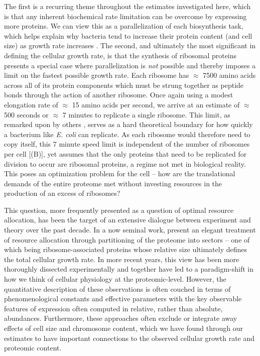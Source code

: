 The first is a recurring theme throughout the estimates investigated here, which
is that any inherent biochemical rate limitation can be overcome by expressing
more proteins. We can view this as a parallelization of each biosynthesis task,
which helps explain why bacteria tend to increase their protein content (and
cell size) as growth rate increases \citep{ojkic2019}. The second, and
ultimately the most significant in defining the cellular growth rate, is that
the synthesis of ribosomal proteins presents a special case where
parallelization is \textit{not} possible and thereby imposes a limit on the
fastest possible growth rate. Each ribosome has $\approx$ 7500 amino acids
across all of its protein components which must be strung together as peptide
bonds through the action of another ribosome. Once again using a modest
elongation rate of $\approx$ 15 amino acids per second, we arrive at an estimate of
$\approx$ 500 seconds or $\approx$ 7 minutes to replicate a single ribosome.
This limit, as remarked upon by others \citep{dill2011}, serves as a hard
theoretical boundary for how quickly a bacterium like \textit{E. coli} can
replicate. As each ribosome would therefore need to copy itself, this 7 minute
speed limit is independent of the number of ribosomes per cell
[(B)], yet assumes that the only proteins that need to be
replicated for division to occur are ribosomal proteins, a regime
not met in biological reality. This poses an optimization problem for the cell
-- how are the translational demands of the entire proteome met without
investing resources in the production of an excess of ribosomes?

This question, more frequently presented as a question of optimal resource
allocation, has been the target of an extensive dialogue between experiment and
theory over the past decade. In a now seminal work,
\cite{scott2010} present an elegant treatment of resource allocation through
partitioning of the proteome into sectors -- one of which being
ribosome-associated proteins whose relative size ultimately defines
the total cellular growth rate. In more recent years, this view has been more
thoroughly dissected experimentally
\citep{klumpp2014,basan2015,dai2018, dai2016, erickson2017} and together
have led to a paradigm-shift in how we think of cellular physiology at the
proteomic-level. However, the quantitative description of these  observations is
often couched in terms of phenomenological constants and effective parameters
with the key observable features of expression often computed in relative, rather
than absolute, abundances. Furthermore, these approaches often exclude or
integrate away effects of cell size and chromosome content, which we have
found through our estimates to have important connections to the observed cellular
growth rate  and proteomic content.

